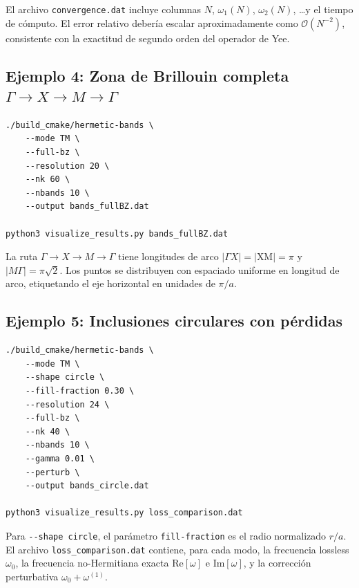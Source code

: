\documentclass[12pt,a4paper]{article}
\begin{document}
El archivo \texttt{convergence.dat} incluye columnas
$N$, $\omega_1(N)$, $\omega_2(N)$, \ldots y el tiempo de cómputo.
El error relativo debería escalar aproximadamente como $\mathcal{O}(N^{-2})$,
consistente con la exactitud de segundo orden del operador de Yee.

\subsection{Ejemplo 4: Zona de Brillouin completa $\Gamma\to X\to M\to\Gamma$}

\begin{lstlisting}[style=bash, caption={Estructura de bandas en la zona de Brillouin completa.}]
./build_cmake/hermetic-bands \
    --mode TM \
    --full-bz \
    --resolution 20 \
    --nk 60 \
    --nbands 10 \
    --output bands_fullBZ.dat

python3 visualize_results.py bands_fullBZ.dat
\end{lstlisting}

La ruta $\Gamma\to X\to M\to\Gamma$ tiene longitudes de arco
$|\Gamma X| = |\text{XM}| = \pi$ y $|M\Gamma| = \pi\sqrt{2}$.
Los puntos se distribuyen con espaciado uniforme en longitud de arco,
etiquetando el eje horizontal en unidades de $\pi/a$.

\subsection{Ejemplo 5: Inclusiones circulares con pérdidas}

\begin{lstlisting}[style=bash, caption={Estructura de bandas con inclusiones circulares y corrección perturbativa.}]
./build_cmake/hermetic-bands \
    --mode TM \
    --shape circle \
    --fill-fraction 0.30 \
    --resolution 24 \
    --full-bz \
    --nk 40 \
    --nbands 10 \
    --gamma 0.01 \
    --perturb \
    --output bands_circle.dat

python3 visualize_results.py loss_comparison.dat
\end{lstlisting}

Para \texttt{-{}-shape circle}, el parámetro \texttt{fill-fraction}
es el radio normalizado $r/a$.
El archivo \texttt{loss\_comparison.dat} contiene, para cada modo,
la frecuencia lossless $\omega_0$, la frecuencia no-Hermitiana exacta
$\text{Re}[\omega]$ e $\text{Im}[\omega]$, y la corrección perturbativa $\omega_0 + \omega^{(1)}$.

\end{document}
